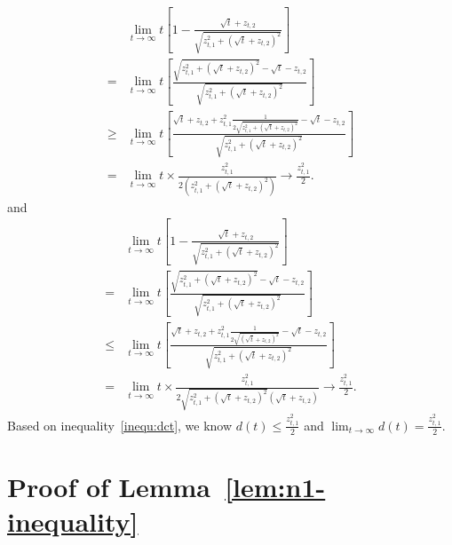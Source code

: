 \begin{align}
&\lim_{t\rightarrow\infty} t\left[1-\frac{\sqrt{t}+z_{t,2}}{\sqrt{z_{t,1}^2+(\sqrt{t}+z_{t,2})^2}}\right] \nonumber \\
=& \lim_{t\rightarrow\infty} t\left[\frac{\sqrt{z_{t,1}^2+(\sqrt{t}+z_{t,2})^2}-\sqrt{t}-z_{t,2}}{\sqrt{z_{t,1}^2+(\sqrt{t}+z_{t,2})^2}}\right]  \nonumber \\
\geq & \lim_{t\rightarrow\infty} t\left[\frac{\sqrt{t}+z_{t,2}+z_{t,1}^{2}\frac{1}{2\sqrt{z_{t,1}^2+(\sqrt{t}+z_{t,2})^2}}-\sqrt{t}-z_{t,2}}{\sqrt{z_{t,1}^2+(\sqrt{t}+z_{t,2})^2}}\right]  \nonumber \\
= & \lim_{t\rightarrow\infty} t \times \frac{z_{t,1}^2}{2(z_{t,1}^2+(\sqrt{t}+z_{t,2})^2)} \rightarrow \frac{z_{t,1}^2}{2}. \nonumber 
\end{align}
and
\begin{align}
&\lim_{t\rightarrow\infty} t\left[1-\frac{\sqrt{t}+z_{t,2}}{\sqrt{z_{t,1}^2+(\sqrt{t}+z_{t,2})^2}}\right] \nonumber \\
=& \lim_{t\rightarrow\infty} t\left[\frac{\sqrt{z_{t,1}^2+(\sqrt{t}+z_{t,2})^2}-\sqrt{t}-z_{t,2}}{\sqrt{z_{t,1}^2+(\sqrt{t}+z_{t,2})^2}}\right]  \nonumber \\
\leq & \lim_{t\rightarrow\infty} t\left[\frac{\sqrt{t}+z_{t,2}+z_{t,1}^{2}\frac{1}{2\sqrt{(\sqrt{t}+z_{t,2})^2}}-\sqrt{t}-z_{t,2}}{\sqrt{z_{t,1}^2+(\sqrt{t}+z_{t,2})^2}}\right]  \nonumber \\
= & \lim_{t\rightarrow\infty} t \times \frac{z_{t,1}^2}{2\sqrt{z_{t,1}^2+(\sqrt{t}+z_{t,2})^2}(\sqrt{t}+z_{t,2})} \rightarrow \frac{z_{t,1}^2}{2}. \label{inequ:dct}
\end{align}   
Based on inequality~\eqref{inequ:dct}, we know $d(t)\leq \frac{z_{t,1}^{2}}{2}$ and $\lim_{t\rightarrow\infty}d(t)=\frac{z_{t,1}^2}{2}$.

\section*{Proof of Lemma~\ref{lem:n1-inequality}}

